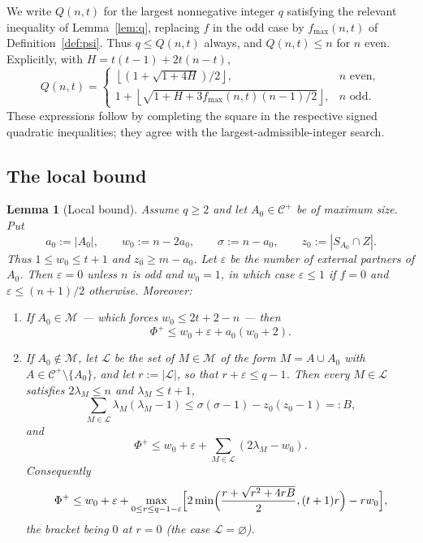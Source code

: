 \documentclass[11pt,a4paper]{amsart}
\theoremstyle{plain}
\newtheorem{lemma}[theorem]{Lemma}
\theoremstyle{definition}
\newcommand{\Cc}{\mathcal{C}}
\newcommand{\Mm}{\mathcal{M}}
\newcommand{\Cp}{\Cc^{+}}
\begin{document}
We write $Q(n,t)$ for the largest nonnegative integer $q$ satisfying the
relevant inequality of Lemma~\ref{lem:q}, replacing $f$ in the odd case by
$f_{\max}(n,t)$ of Definition~\ref{def:psi}. Thus $q\le Q(n,t)$ always, and
$Q(n,t)\le n$ for $n$ even. Explicitly, with $H=t(t-1)+2t(n-t)$,
\[
 Q(n,t)=\begin{cases}
 \left\lfloor(1+\sqrt{1+4H})/2\right\rfloor,&n\text{ even},\\
 1+\left\lfloor\sqrt{1+H+3f_{\max}(n,t)(n-1)/2}\right\rfloor,&n\text{ odd}.
 \end{cases}
\]
These expressions follow by completing the square in the respective signed
quadratic inequalities; they agree with the largest-admissible-integer search.

\subsection*{The local bound}

\begin{lemma}[Local bound]\label{lem:local}
Assume $q\ge2$ and let $A_0\in\Cp$ be of maximum size. Put
\[
  a_0:=|A_0|,\qquad
  w_0:=n-2a_0,\qquad
  \sigma:=n-a_0,\qquad
  z_0:=|S_{A_0}\cap Z|.
\]
Thus $1\le w_0\le t+1$ and $z_0\ge m-a_0$. Let $\varepsilon$ be the number of
external partners of $A_0$. Then $\varepsilon=0$ unless $n$ is odd and
$w_0=1$, in which case $\varepsilon\le1$ if $f=0$ and
$\varepsilon\le(n+1)/2$ otherwise. Moreover:

\begin{enumerate}
\item[\rm(A)] If $A_0\in\Mm$ --- which forces $w_0\le2t+2-n$ --- then
\[
  \Phi^+\le w_0+\varepsilon+a_0(w_0+2).
\]

\item[\rm(B)] If $A_0\notin\Mm$, let $\mathcal L$ be the set of $M\in\Mm$ of the
form $M=A\cup A_0$ with $A\in\Cp\setminus\{A_0\}$, and let
$r:=|\mathcal L|$, so that $r+\varepsilon\le q-1$. Then every
$M\in\mathcal L$ satisfies $2\lambda_M\le n$ and $\lambda_M\le t+1$,
\[
  \sum_{M\in\mathcal L}\lambda_M(\lambda_M-1)
  \le
  \sigma(\sigma-1)-z_0(z_0-1)=:B,
\]
and
\[
  \Phi^+
  \le
  w_0+\varepsilon+\sum_{M\in\mathcal L}(2\lambda_M-w_0).
\]
Consequently
\[
  \Phi^+
  \le
  w_0+\varepsilon+
  \max_{0\le r\le q-1-\varepsilon}
  \Bigl[
    2\min\Bigl(
      \frac{r+\sqrt{r^2+4rB}}2,
      (t+1)r
    \Bigr)
    -rw_0
  \Bigr],
\]
the bracket being $0$ at $r=0$ (the case $\mathcal L=\varnothing$).
\end{enumerate}
\end{lemma}
\end{document}
